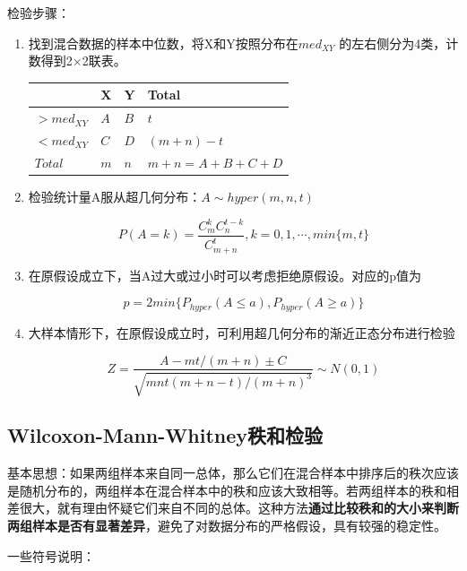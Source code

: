 \documentclass[
]{book}
\begin{document}
检验步骤：

\begin{enumerate}
\def\labelenumi{\arabic{enumi}.}
\item
  找到混合数据的样本中位数，将X和Y按照分布在\(med_{XY}\) 的左右侧分为4类，计数得到2×2联表。

  \begin{longtable}[]{@{}llll@{}}
  \toprule\noalign{}
  & X & Y & Total \\
  \midrule\noalign{}
  \endhead
  \bottomrule\noalign{}
  \endlastfoot
  \(>med_{XY}\) & \(A\) & \(B\) & \(t\) \\
  \(<med_{XY}\) & \(C\) & \(D\) & \((m+n)-t\) \\
  \(Total\) & \(m\) & \(n\) & \(m+n=A+B+C+D\) \\
  \end{longtable}
\item
  检验统计量A服从超几何分布：\(A\sim hyper(m,n,t)\)

  \[
  P(A=k)=\frac{C_m^kC_n^{t-k}}{C_{m+n}^t},k = 0,1,\cdots, min\{m,t\}
  \]
\item
  在原假设成立下，当A过大或过小时可以考虑拒绝原假设。对应的p值为

  \[
  p = 2 min \{ P_{hyper}(A\leq a),P_{hyper}(A\geq a)\}
  \]
\item
  大样本情形下，在原假设成立时，可利用超几何分布的渐近正态分布进行检验

  \[
  Z=\frac{A-mt/(m+n)\pm C}{\sqrt{mnt(m+n-t)/(m+n)^3}}\sim N(0,1)
  \]
\end{enumerate}

\subsection{Wilcoxon-Mann-Whitney秩和检验}\label{wilcoxon-mann-whitneyux79e9ux548cux68c0ux9a8c}

基本思想：如果两组样本来自同一总体，那么它们在混合样本中排序后的秩次应该是随机分布的，两组样本在混合样本中的秩和应该大致相等。若两组样本的秩和相差很大，就有理由怀疑它们来自不同的总体。这种方法\textbf{通过比较秩和的大小来判断两组样本是否有显著差异}，避免了对数据分布的严格假设，具有较强的稳定性。

一些符号说明：
\end{document}
